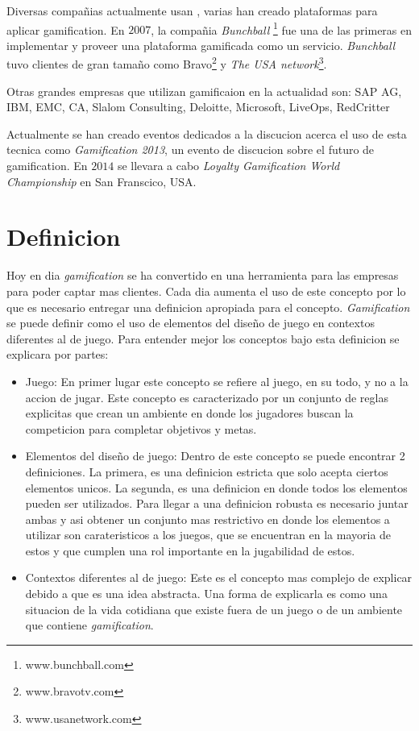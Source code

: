 Diversas compañias actualmente usan {\GAM}, varias han creado plataformas para aplicar gamification.
En $2007$, la compañia \emph{Bunchball} \footnote{www.bunchball.com} fue una de las primeras en implementar y proveer
una plataforma gamificada como un servicio\cite{Gam:Bunchball:1}. \emph{Bunchball} tuvo clientes de gran tamaño como
Bravo\footnote{www.bravotv.com} y \emph{The USA network}\footnote{www.usanetwork.com}\cite{Gam:Bunchball:2}.

Otras grandes empresas que utilizan gamificaion en la actualidad son: SAP AG, IBM, EMC, CA, Slalom Consulting,
 Deloitte, Microsoft, LiveOps, RedCritter\cite{Gam:Companies:1}  

Actualmente se han creado eventos dedicados a la discucion acerca el uso de esta tecnica como
 \emph{Gamification 2013}, un evento de discucion sobre el futuro de gamification\cite{Gam:Events:1}. 
En $2014$ se llevara a cabo \emph{Loyalty Gamification World Championship} en San Franscico, USA.\cite{Gam:Events:2}

\section{Definicion}

Hoy en dia \emph{gamification} se ha convertido en una herramienta para las empresas 
para poder captar mas clientes. Cada dia aumenta el uso de este concepto por lo que es
necesario entregar una definicion apropiada para el concepto.  \emph{Gamification} se puede definir
como el uso de elementos del diseño de juego en contextos diferentes al de juego. Para entender mejor 
los conceptos bajo esta definicion se explicara por partes:

\begin{itemize}

\item Juego: En primer lugar este concepto se refiere al juego, en su todo, y no a la accion de jugar.
Este concepto es caracterizado por un conjunto de reglas explicitas que crean un ambiente  
en donde los jugadores buscan la competicion para completar objetivos y metas.

\item Elementos del diseño de juego: Dentro de este concepto se puede encontrar 2 definiciones.
La primera, es una definicion estricta que solo acepta ciertos elementos unicos. La segunda, 
es una definicion en donde todos los elementos pueden ser utilizados. Para llegar a una 
definicion robusta es necesario juntar ambas y asi obtener un conjunto mas restrictivo en donde 
los elementos a utilizar son carateristicos a los juegos, que se encuentran en la mayoria de estos y 
que cumplen una rol importante en la jugabilidad de estos.

\item Contextos diferentes al de juego: Este es el concepto mas complejo de explicar debido a que es una idea  
abstracta. Una forma de explicarla es como una situacion de la vida cotidiana que existe fuera 
de un juego o de un ambiente que contiene \emph{gamification}.

\end{itemize}

